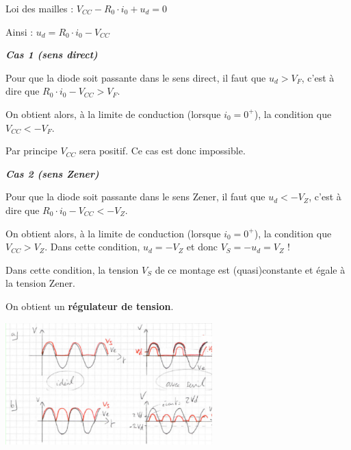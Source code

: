 \documentclass[a4paper,french]{paper}
\begin{document}
Loi des mailles : $V_{CC} - R_0 \cdot i_0 + u_d = 0$

Ainsi : $u_d = R_0 \cdot i_0 - V_{CC}$

\textbf{\textit{Cas 1 (sens direct)}}

Pour que la diode soit passante dans le sens direct, il faut que $u_d > V_F$, c'est à dire que $R_0 \cdot i_0 - V_{CC} > V_F$.

On obtient alors, à la limite de conduction (lorsque $i_0 = 0^+$), la condition que $V_{CC} < -V_F$.

Par principe $V_{CC}$ sera positif. Ce cas est donc impossible.


\textbf{\textit{Cas 2 (sens Zener)}}

Pour que la diode soit passante dans le sens Zener, il faut que $u_d < -V_Z$, c'est à dire que $R_0 \cdot i_0 - V_{CC} < -V_Z$.

On obtient alors, à la limite de conduction (lorsque $i_0 = 0^+$), la condition que $V_{CC} > V_Z$. Dans cette condition, $u_d = -V_Z$ et donc $V_S = -u_d = V_Z$ !

Dans cette condition, la tension $V_S$ de ce montage est (quasi)constante et égale à la tension Zener.

On obtient un \textbf{régulateur de tension}.




\begin{center}
	\includegraphics[width=8cm]{images/redresseur_001_a_cor.png}
\end{center}
	
\end{document}

